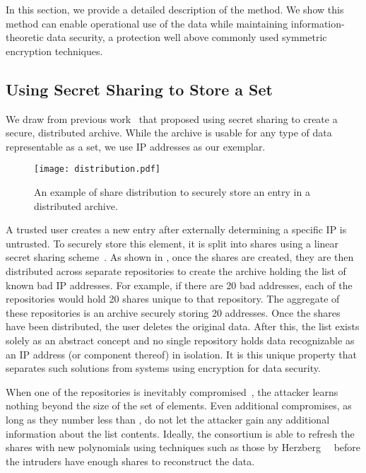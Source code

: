 

In this section, we provide a detailed description of the \SIFlong
method.  We show this method can enable operational use of the data
while maintaining information-theoretic data security, a protection
well above commonly used symmetric encryption techniques.

\subsection{Using Secret Sharing to Store a Set}
\label{ssec:background:set}

We draw from previous work~\cite{Ganger2001,Subbiah2005,Storer2009,Kroeger2013}
that proposed using secret sharing to create a secure, distributed
archive.  While the archive is usable for any type of data representable as a set, 
we use IP addresses as our exemplar.

\begin{figure}[t]
\begin{center}
\begin{adjustbox}{max totalsize={0.95\columnwidth}{0.95\columnwidth},center}
\texttt{[image: distribution.pdf]}
\end{adjustbox}
 \end{center}
\caption{An example of share distribution to securely store an entry in a distributed archive.}
\label{fig:createList}
\end{figure}

A trusted user creates a new entry after externally determining a specific
IP is untrusted.  To securely store this element, it is split into 
shares using a  linear secret sharing scheme~\cite{Shamir1979}.
As shown in , once the shares are created, they
are then distributed across  separate repositories to create the
archive holding the list of known bad IP addresses.  For example,
if there are 20 bad addresses, each of the  repositories would hold
20 shares unique to that repository.  The aggregate of these repositories
is an archive securely
storing 20 addresses. Once the shares have been distributed, the
user deletes the original data.  After this, the list exists solely as an abstract
concept and no single repository holds data recognizable as an
IP address (or component thereof) in isolation.  It is this unique
property that separates such solutions from systems using encryption
for data security.

When one of the repositories is inevitably compromised~\cite{Zaichkowsky2013}, 
the attacker learns nothing beyond the size of the set of elements.  Even additional 
compromises, as long as they number less than , do not let the attacker 
gain any additional information about the list contents. Ideally, the 
consortium is able to refresh the shares with new polynomials using 
techniques such as those by Herzberg~\etal~\cite{Herzberg1995} before the 
intruders have enough shares to reconstruct the data.

